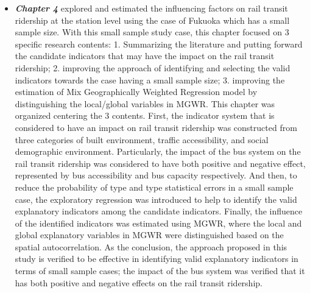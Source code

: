 \begin{itemize}
	\item \emph{\textbf{Chapter 4}} explored and estimated the influencing factors on rail transit ridership at the station level using the case of Fukuoka which has a small sample size. With this small sample study case, this chapter focused on 3 specific research contents: 1. Summarizing the literature and putting forward the candidate indicators that may have the impact on the rail transit ridership; 2. improving the approach of identifying and selecting the valid indicators towards the case having a small sample size; 3. improving the estimation of Mix Geographically Weighted Regression model by distinguishing the local/global variables in MGWR.	This chapter was organized centering the 3 contents. First, the indicator system that is considered to have an impact on rail transit ridership was constructed from three categories of built environment, traffic accessibility, and social demographic environment. Particularly, the impact of the bus system on the rail transit ridership was considered to have both positive and negative effect, represented by bus accessibility and bus capacity respectively. And then, to reduce the probability of type \uppercase\expandafter{} and type \uppercase\expandafter{} statistical errors in a small sample case, the exploratory regression was introduced to help to identify the valid explanatory indicators among the candidate indicators. Finally, the influence of the identified indicators was estimated using MGWR, where the local and global explanatory variables in MGWR were distinguished based on the spatial autocorrelation. As the conclusion, the approach proposed in this study is verified to be effective in identifying valid explanatory indicators in terms of small sample cases; the impact of the bus system was verified that it has both positive and negative effects on the rail transit ridership.
	

\end{itemize}
